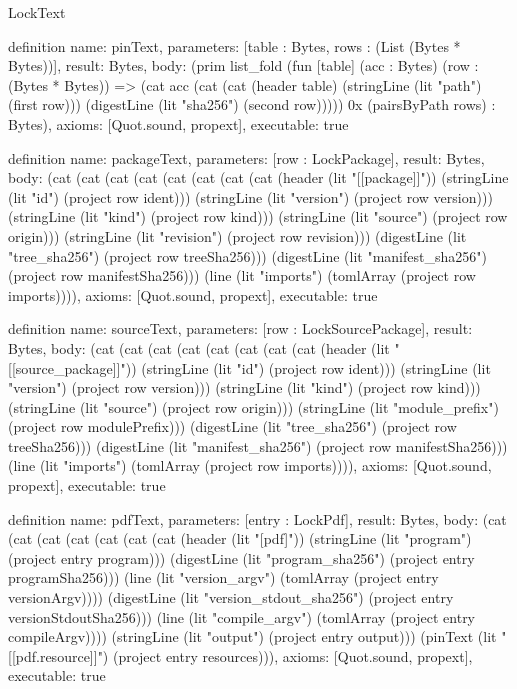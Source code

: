 \begin{lexlean}{LockText}
\begin{semanticmodule}
definition{
  name: pinText,
  parameters: [table : Bytes, rows : (List (Bytes * Bytes))],
  result: Bytes,
  body: (prim list_fold (fun [table] (acc : Bytes) (row : (Bytes * Bytes)) => (cat acc (cat (cat (header table) (stringLine (lit "path") (first row))) (digestLine (lit "sha256") (second row))))) 0x (pairsByPath rows) : Bytes),
  axioms: [Quot.sound, propext],
  executable: true
}

definition{
  name: packageText,
  parameters: [row : LockPackage],
  result: Bytes,
  body: (cat (cat (cat (cat (cat (cat (cat (cat (header (lit "[[package]]")) (stringLine (lit "id") (project row ident))) (stringLine (lit "version") (project row version))) (stringLine (lit "kind") (project row kind))) (stringLine (lit "source") (project row origin))) (stringLine (lit "revision") (project row revision))) (digestLine (lit "tree_sha256") (project row treeSha256))) (digestLine (lit "manifest_sha256") (project row manifestSha256))) (line (lit "imports") (tomlArray (project row imports)))),
  axioms: [Quot.sound, propext],
  executable: true
}

definition{
  name: sourceText,
  parameters: [row : LockSourcePackage],
  result: Bytes,
  body: (cat (cat (cat (cat (cat (cat (cat (cat (header (lit "[[source_package]]")) (stringLine (lit "id") (project row ident))) (stringLine (lit "version") (project row version))) (stringLine (lit "kind") (project row kind))) (stringLine (lit "source") (project row origin))) (stringLine (lit "module_prefix") (project row modulePrefix))) (digestLine (lit "tree_sha256") (project row treeSha256))) (digestLine (lit "manifest_sha256") (project row manifestSha256))) (line (lit "imports") (tomlArray (project row imports)))),
  axioms: [Quot.sound, propext],
  executable: true
}

definition{
  name: pdfText,
  parameters: [entry : LockPdf],
  result: Bytes,
  body: (cat (cat (cat (cat (cat (cat (cat (header (lit "[pdf]")) (stringLine (lit "program") (project entry program))) (digestLine (lit "program_sha256") (project entry programSha256))) (line (lit "version_argv") (tomlArray (project entry versionArgv)))) (digestLine (lit "version_stdout_sha256") (project entry versionStdoutSha256))) (line (lit "compile_argv") (tomlArray (project entry compileArgv)))) (stringLine (lit "output") (project entry output))) (pinText (lit "[[pdf.resource]]") (project entry resources))),
  axioms: [Quot.sound, propext],
  executable: true
}


\end{semanticmodule}
\end{lexlean}
